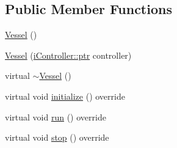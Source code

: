 \subsection*{Public Member Functions}
\begin{DoxyCompactItemize}
\item 
\hyperlink{classo_cpt_1_1_vessel_ab6dd985345a5c23e200db425553f8358}{Vessel} ()
\item 
\hyperlink{classo_cpt_1_1_vessel_ac8dacffe9254893d8e55b6c08fbca6c2}{Vessel} (\hyperlink{classo_cpt_1_1i_controller_a6d89a95cd6ad68bb74adfaca2f36370f}{i\+Controller\+::ptr} controller)
\item 
virtual \hyperlink{classo_cpt_1_1_vessel_ac48b6cdeb7449a1523d8398dfcff0b37}{$\sim$\+Vessel} ()
\item 
virtual void \hyperlink{classo_cpt_1_1_vessel_a64af8c6be9c915b76f37cff6abc5be36}{initialize} () override
\item 
virtual void \hyperlink{classo_cpt_1_1_vessel_a6cd07e32cc601b1f3a45881b42ea36ef}{run} () override
\item 
virtual void \hyperlink{classo_cpt_1_1_vessel_a87e321618ea1d1ca21fffbe64bbffbc0}{stop} () override
\end{DoxyCompactItemize}
